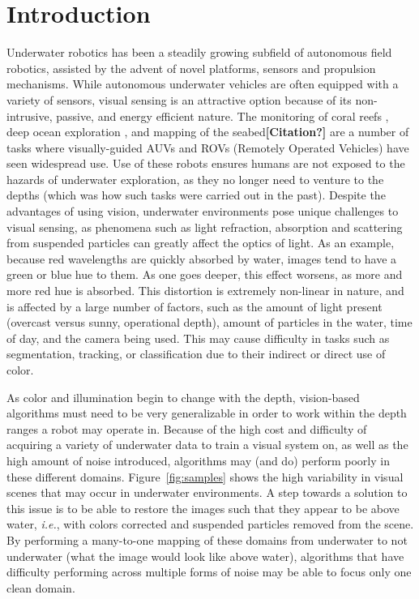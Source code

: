 \documentclass[letterpaper, 10pt, conference]{ieeeconf}
\newcommand{\marginlabel}[1]{\mbox{}\marginpar[\raggedleft\hspace{0pt}{#1}]{
\raggedright\hspace{0pt}{#1}}}
\newcommand{\starnote}[1]{\marginlabel{$\bigstar$}\textbf{[#1]}}
\begin{document}
\section{Introduction}
Underwater robotics has been a steadily growing subfield of autonomous field robotics, assisted by the advent of novel platforms,
sensors and propulsion mechanisms. While autonomous underwater vehicles are often equipped with a variety of sensors, visual sensing is an
attractive option because of its non-intrusive, passive, and energy efficient nature. The monitoring of coral reefs \cite{shkurti2012multi},
deep ocean exploration \cite{whitcomb2000advances}, and mapping of the seabed\starnote{Citation?} are a number of tasks where
visually-guided AUVs and ROVs (Remotely Operated Vehicles) have seen widespread use. Use of these robots ensures humans are not exposed to
the hazards of underwater exploration, as they no longer need to venture to the depths (which was how such tasks were carried out in the
past). Despite the advantages of using vision, underwater environments pose unique challenges to visual sensing, as phenomena such as light
refraction, absorption and scattering from suspended particles can greatly affect the optics of light. As an example, because red
wavelengths are quickly absorbed by water, images tend to have a green or blue hue to them. As one goes deeper, this effect worsens, as more
and more red hue is absorbed. This distortion is extremely non-linear in nature, and is affected by a large number of factors, such as the
amount of light present (overcast versus sunny, operational depth), amount of particles in the water, time of day, and the camera being
used. This may cause difficulty in tasks such as segmentation, tracking, or classification due to their indirect or direct use of color.

As color and illumination begin to change with the depth, vision-based algorithms must need to be very generalizable in order to work within
the depth ranges a robot may operate in. Because of the high cost and difficulty of acquiring a variety of underwater data to train a visual
system on, as well as the high amount of noise introduced, algorithms may (and do) perform poorly in these different
domains. Figure~\ref{fig:samples} shows the high variability in visual scenes that may occur in
underwater environments. A step towards a solution to this issue is to be able to restore the images such that they appear to be above
water, \emph{i.e.}, with colors corrected and suspended particles removed from the scene. By performing a many-to-one mapping of these
domains from underwater to not underwater (what the image would look like above water), algorithms that have difficulty performing across
multiple forms of noise may be able to focus only one clean domain.
\end{document}
